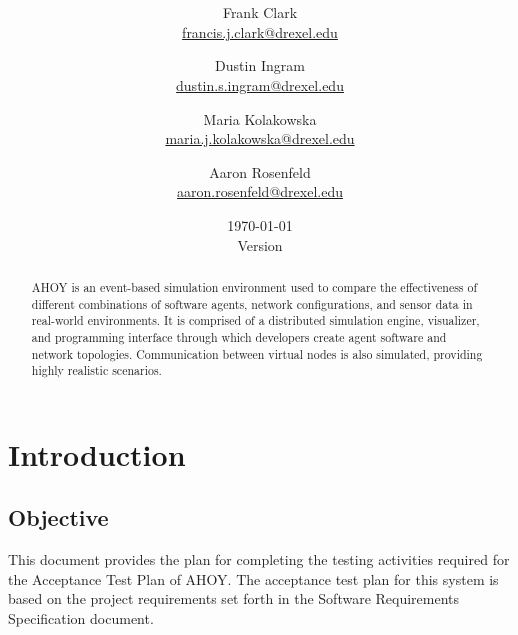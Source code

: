 \documentclass[titlepage]{article}
\title{\textbf{\mytitle}}
\author{
    Frank Clark \\\url{francis.j.clark@drexel.edu}
    \and Dustin Ingram \\\url{dustin.s.ingram@drexel.edu}
    \and Maria Kolakowska \\\url{maria.j.kolakowska@drexel.edu}
    \and Aaron Rosenfeld \\\url{aaron.rosenfeld@drexel.edu}
}
\date{\today\\Version \version}
\begin{document}

\begin{figure}
    \vspace{-2em}
    \centering
    
    \vspace{-4em}
\end{figure}

\maketitle

\begin{abstract}
AHOY is an event-based simulation environment used to compare the effectiveness of different combinations of software agents, network configurations, and sensor data in real-world environments.  It is comprised of a distributed simulation engine, visualizer, and programming interface through which developers create agent software and network topologies.  Communication between virtual nodes is also simulated, providing highly realistic scenarios.
\end{abstract}

\setcounter{tocdepth}{4}
\tableofcontents
\pagebreak
{}



\section{Introduction%
  \label{introduction}%
}


\subsection{Objective%
  \label{objective}%
}
    This document provides the plan for completing the testing activities required for the Acceptance Test Plan of AHOY. The acceptance test plan for this system is based on the project requirements set forth in the Software Requirements Specification document.

\end{document}
